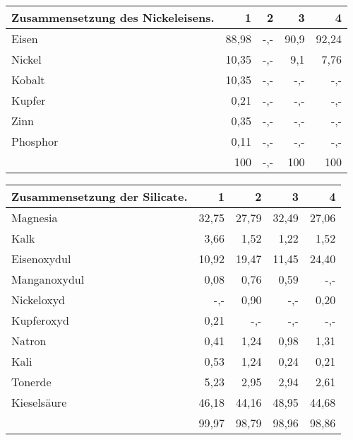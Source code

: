 \documentclass[a4paper, 11pt, oneside]{article}
\begin{document}
\vspace{\medskipamount}
\begin{center}
\begin{tabular}{ |l|r|r|r|r| }
    \hline
    Zusammensetzung des Nickeleisens. & 1 & 2 & 3 & 4\\
    \hline\hline
    Eisen & 88,98 & -,- & 90,9 & 92,24\\\hline
    Nickel & 10,35 & -,- & 9,1 & 7,76\\\hline
    Kobalt & 10,35 & -,- & -,- & -,-\\\hline
    Kupfer & 0,21 & -,- & -,- & -,-\\\hline
    Zinn & 0,35 & -,- & -,- & -,-\\\hline
    Phosphor & 0,11 & -,- & -,- & -,-\\\hline
     & 100 & -,- & 100 & 100\\
    \hline
\end{tabular}
\end{center}
\vspace{\medskipamount}
\begin{center}
\begin{tabular}{ |l|r|r|r|r| }
    \hline
    Zusammensetzung der Silicate. & 1 & 2 & 3 & 4\\
    \hline\hline
    Magnesia & 32,75 & 27,79 & 32,49 & 27,06\\\hline
    Kalk & 3,66 & 1,52 & 1,22 & 1,52\\\hline
    Eisenoxydul & 10,92 & 19,47 & 11,45 & 24,40\\\hline
    Manganoxydul & 0,08 & 0,76 & 0,59 & -,-\\\hline
    Nickeloxyd & -,- & 0,90 & -,- & 0,20\\\hline
    Kupferoxyd & 0,21 & -,- & -,- & -,-\\\hline
    Natron & 0,41 & 1,24 & 0,98 & 1,31\\\hline
    Kali & 0,53 & 1,24 & 0,24 & 0,21\\\hline
    Tonerde & 5,23 & 2,95 & 2,94 & 2,61\\\hline
    Kieselsäure & 46,18 & 44,16 & 48,95 & 44,68\\\hline
     & 99,97 & 98,79 & 98,96 & 98,86\\
    \hline
\end{tabular}
\end{center}
\end{document}
